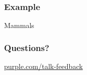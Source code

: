 \documentclass[t]{beamer}
\begin{document}
\begin{frame}
  \frametitle{Example}

  \centerline{Mammals}


  
\end{frame}

\begin{frame}
  \frametitle{Questions?}
  \vspace{3cm}
  \centerline{\large\url{purple.com/talk-feedback}}
\end{frame}

\end{document}
